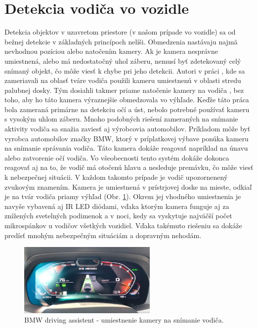 \documentclass[slovak,master,dept460,male,cpp,cpdeclaration]{diploma}
\begin{document}
\section{Detekcia vodiča vo vozidle}
\label{sec:Pose detection}
Detekcia objektov v uzavretom priestore (v našom prípade vo vozidle) sa od bežnej detekcie v základných princípoch nelíši. Obmedzenia nastávaju najmä nevhodnou pozíciou alebo natočením kamery. Ak je kamera nesprávne umiestnená, alebo má nedostatočný uhol záberu, nemusí byť zdetekovaný celý snímaný objekt, čo môže viesť k chybe pri jeho detekcii. Autori v práci \cite{smith2003determining}, kde sa zameriavali na oblasť tváre vodiča použili kameru umiestnenú v oblasti stredu palubnej dosky. Tým dosiahli takmer priame natočenie kamery na vodiča , bez toho, aby ho táto kamera výraznejšie obmedzovala vo výhľade. Keďže táto práca bola zameraná primárne na detekciu očí a úst, nebolo potrebné  používať kameru s vysokým uhlom záberu. Mnoho podobných riešení zameraných na snímanie aktivity vodiča sa snažia zaviesť aj výrobcovia automobilov. Príkladom môže byť vyrobca  automobilov značky BMW, ktorý v príplatkovej výbave ponúka kameru na snímanie správania vodiča. Táto kamera dokáže reagovať napríklad na únavu alebo zatvorenie očí vodiča. Vo všeobecnosti tento systém dokáže dokonca reagovať aj na to, že vodič má otočenú hlavu a nesleduje premávku, čo môže viesť k nebezpečnej situácii. V každom takomto prípade je vodič upozornenený zvukovým znamením. Kamera je umiestnená v prístrjovej doske na mieste, odkiaľ je na tvár vodiča priamy výhľad (Obr. \ref{fig:bmwAssistent}). Okrem jej vhodného umiestnenia je navyše vybavená aj IR LED diódami, vďaka ktorým kamera funguje aj za znížených svetelných podimenok a v noci, kedy sa vyskytuje najväčší počet mikrospánkov u vodičov všetkých vozidiel. Vďaka takémuto riešeniu sa dokáže predísť mnohým nebezpečným situáciám a dopravným nehodám.

\begin{figure}[H]
	\centering
	\includegraphics[width=0.6\textwidth]{Figures/bmw.jpg}
	\caption{BMW driving assistent - umiestnenie kamery na snímanie vodiča.\cite{bmw2019assistent}}
	\label{fig:bmwAssistent}
\end{figure}
\end{document}

